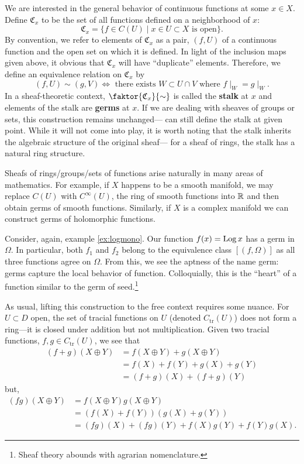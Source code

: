 We are interested in the general behavior of continuous functions at some
\(x \in X\). Define \(\mathfrak{C}_x\) to be the set of all functions defined on a
neighborhood of \(x\):
\[
  \mathfrak{C}_x = \{f \in C(U) \mid x \in U \subset X \text{ is open}\}.
\]
By convention, we refer to elements of \(\mathfrak{C}_x\) as a pair, \((f,U)\) of
a continuous function and the open set on which it is defined.
In light of the inclusion maps given above, it obvious that \(\mathfrak{C}_x\)
will have ``duplicate'' elements. Therefore, we define an equivalence relation
on \(\mathfrak{C}_x\) by
\[
(f,U) \sim (g,V) \Leftrightarrow \textrm{ there exists }
W \subset U \cap V \textrm{ where } f \mid _W = g\mid _W.
\]
In a sheaf-theoretic
context, \(\faktor{\mathfrak{C}_x}{\sim} \) is called the \textbf{stalk} at \(x\)
and elements of the stalk are \textbf{germs} at \(x\). If we are dealing with
sheaves of groups or sets, this construction remains unchanged---\ie{} can still
define the stalk at given point. While it will not come into play, it is worth
noting that the stalk inherits the algebraic structure of the original
sheaf---\eg{} for a sheaf of rings, the stalk has a natural ring
structure.

Sheafs of rings/groups/sets of functions arise naturally in many areas of
mathematics. For example, if \(X\) happens to be a smooth manifold, we may
replace \(C(U)\) with \(C^\infty(U)\), the ring of smooth functions into
\(\mathbb{R} \) and then obtain germs of smooth functions.  Similarly, if \(X\) is a
complex manifold we can construct germs of holomorphic functions.

\begin{example}
Consider, again, example \ref{ex:logmono}. Our function \(f(x)= \operatorname{Log} x\) has
a germ in \(\Omega\). In particular, both \(f_1\) and \(f_2\) belong to the
equivalence class \([(f,\Omega)]\) as all three functions agree on \(\Omega\).
From this, we see the aptness of the name germ: germs capture the
local behavior of function. Colloquially, this is the ``heart'' of a
function similar to the germ of seed.\footnote{Sheaf theory abounds with
  agrarian nomenclature.}
\end{example}


As usual, lifting this construction to the free context requires some nuance.
For \(U \subset D\) open, the set of tracial functions on \(U\) (denoted
\(C_{\text{tr}}(U)\)) does not form a ring---it is closed under addition but not
multiplication. Given two tracial functions, \(f,g \in C_{\text{tr}}(U)\), we see
that
\begin{align*}
  (f+g)(X \oplus Y) &= f(X \oplus Y) + g(X \oplus Y) \\
                    &= f(X) + f(Y)+g(X) + g(Y) \\
                    &= (f+g) (X) + (f+g)(Y)
\end{align*}
but,
\begin{align*}
  (fg)(X \oplus Y) &= f(X \oplus Y)g(X \oplus Y) \\
                   &= (f(X) + f(Y))(g(X) + g(Y)) \\
                   &= (fg) (X) + (fg)(Y) + f(X)g(Y)+f(Y)g(X).
\end{align*}

